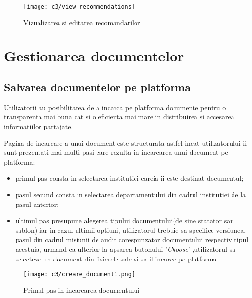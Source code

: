 \newpage
\vspace{1cm}
\begin{figure}[h]
	\centering
	
	\texttt{[image: c3/view\_recommendations]}
	\caption{Vizualizarea si editarea recomandarilor}
\end{figure}

\section{Gestionarea documentelor}

\subsection*{Salvarea documentelor pe platforma}

Utilizatorii au posibilitatea de a incarca pe platforma documente pentru o transparenta mai buna cat si o eficienta mai mare in distribuirea si accesarea informatiilor partajate.

Pagina de incarcare a unui document este structurata astfel incat utilizatorului ii sunt prezentati mai multi pasi care rezulta in incarcarea unui document pe platforma:
	
	\begin{itemize}
		\item  primul pas consta in selectarea institutiei careia ii este destinat documentul;
		
		\item pasul secund consta in selectarea departamentului din cadrul institutiei de la pasul anterior;
		
		\item ultimul pas presupune alegerea tipului documentului(de sine statator sau sablon) iar in cazul ultimii optiuni, utilizatorul trebuie sa specifice versiunea, pasul din cadrul misiunii de audit corespunzator documentului respectiv tipul acestuia, urmand ca ulterior la apsarea butonului '\textit{Choose}' ,utilizatorul sa selecteze un document din fisierele sale si sa il incarce pe platforma.
		
		
	\end{itemize}


\vspace{1cm}
\begin{figure}[h]
	\centering
	
	\texttt{[image: c3/creare\_document1.png]}
	\caption{Primul pas in incarcarea documentului}
\end{figure}


